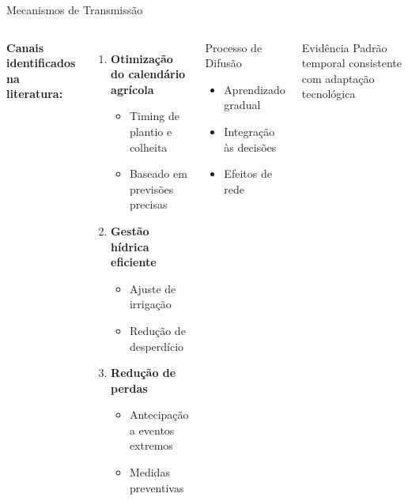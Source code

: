 \documentclass[10pt,aspectratio=169]{beamer}
\begin{document}
\begin{frame}{Mecanismos de Transmissão}
\begin{columns}
\textbf{Canais identificados na literatura:}
\begin{enumerate}
    \item \textbf{Otimização do calendário agrícola}
    \begin{itemize}
        \item Timing de plantio e colheita
        \item Baseado em previsões precisas
    \end{itemize}
    
    \item \textbf{Gestão hídrica eficiente}
    \begin{itemize}
        \item Ajuste de irrigação
        \item Redução de desperdício
    \end{itemize}
    
    \item \textbf{Redução de perdas}
    \begin{itemize}
        \item Antecipação a eventos extremos
        \item Medidas preventivas
    \end{itemize}
\end{enumerate}

\begin{block}{Processo de Difusão}
\begin{itemize}
    \item Aprendizado gradual
    \item Integração às decisões
    \item Efeitos de rede
\end{itemize}
\end{block}

\begin{alertblock}{Evidência}
Padrão temporal consistente com adaptação tecnológica
\end{alertblock}
\end{columns}
\end{frame}
\end{document}
